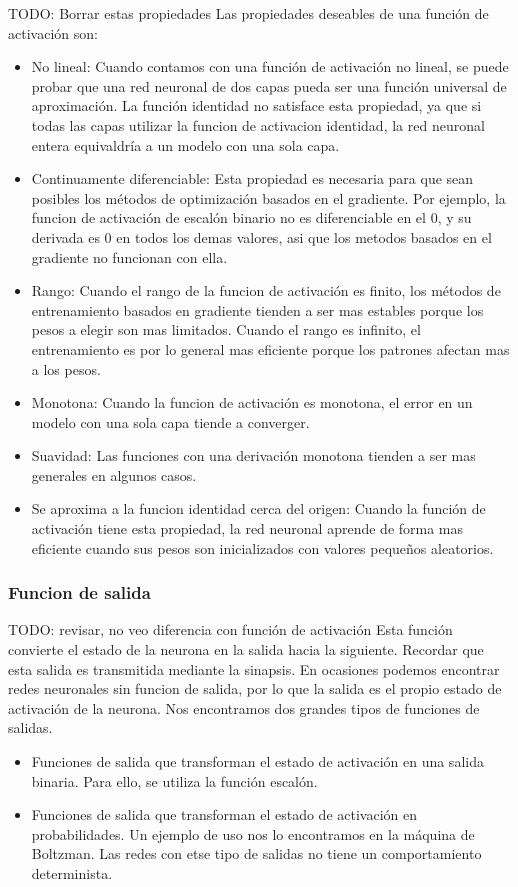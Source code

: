 TODO: Borrar estas propiedades
Las propiedades deseables de una función de activación son:
\begin{itemize}
\item No lineal: Cuando contamos con una función de activación no lineal, se puede probar que una red neuronal de dos capas pueda ser una función universal de aproximación. La función identidad no satisface esta propiedad, ya que si todas las capas utilizar la funcion de activacion identidad, la red neuronal entera equivaldría a un modelo con una sola capa.
\item Continuamente diferenciable: Esta propiedad es necesaria para que sean posibles los métodos de optimización basados en el gradiente. Por ejemplo, la funcion de activación de escalón binario no es diferenciable en el 0, y su derivada es 0 en todos los demas valores, asi que los metodos basados en el gradiente no funcionan con ella.
\item Rango: Cuando el rango de la funcion de activación es finito, los métodos de entrenamiento basados en gradiente tienden a ser mas estables porque los pesos a elegir son mas limitados. Cuando el rango es infinito, el entrenamiento es por lo general mas eficiente porque los patrones afectan mas a los pesos.
\item Monotona: Cuando la funcion de activación es monotona, el error en un modelo con una sola capa tiende a converger.
\item Suavidad: Las funciones con una derivación monotona tienden a ser mas generales en algunos casos.
\item Se aproxima a la funcion identidad cerca del origen: Cuando la función de activación tiene esta propiedad, la red neuronal aprende de forma mas eficiente cuando sus pesos son inicializados con valores pequeños aleatorios.
\end{itemize}

\subsubsection {Funcion de salida}
TODO: revisar, no veo diferencia con función de activación
Esta función convierte el estado de la neurona en la salida hacia la siguiente. Recordar que esta salida es transmitida mediante la sinapsis. En ocasiones podemos encontrar redes neuronales sin funcion de salida, por lo que la salida es el propio estado de activación de la neurona. Nos encontramos dos grandes tipos de funciones de salidas.
\begin{itemize}
\item Funciones de salida que transforman el estado de activación en una salida binaria. Para ello, se utiliza la función escalón.
\item Funciones de salida que transforman el estado de activación en probabilidades. Un ejemplo de uso nos lo encontramos en la máquina de Boltzman. Las redes con etse tipo de salidas no tiene un comportamiento determinista.
\end{itemize}


